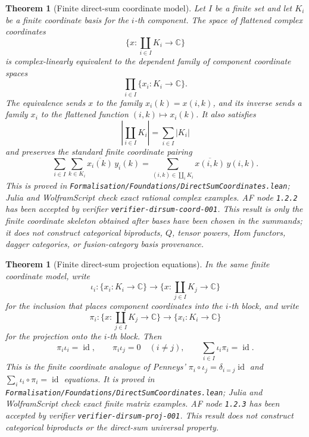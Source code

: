 \documentclass[11pt]{article}
\newtheorem{theorem}[definition]{Theorem}
\begin{document}
\begin{theorem}[Finite direct-sum coordinate model]
Let \(I\) be a finite set and let \(K_i\) be a finite coordinate basis for
the \(i\)-th component. The space of flattened complex coordinates
\[
\{x:\coprod_{i\in I}K_i\to \mathbb C\}
\]
is complex-linearly equivalent to the dependent family of component coordinate
spaces
\[
\prod_{i\in I}\{x_i:K_i\to\mathbb C\}.
\]
The equivalence sends \(x\) to the family \(x_i(k)=x(i,k)\), and its inverse
sends a family \(x_i\) to the flattened function \((i,k)\mapsto x_i(k)\).
It also satisfies
\[
\left|\coprod_{i\in I}K_i\right|=\sum_{i\in I}|K_i|
\]
and preserves the standard finite coordinate pairing
\[
\sum_{i\in I}\sum_{k\in K_i}\overline{x_i(k)}\,y_i(k)
=
\sum_{(i,k)\in\coprod_i K_i}\overline{x(i,k)}\,y(i,k).
\]
This is proved in
\texttt{Formalisation/Foundations/DirectSumCoordinates.lean}; Julia and
WolframScript check exact rational complex examples. AF node \texttt{1.2.2}
has been accepted by verifier \texttt{verifier-dirsum-coord-001}. This result
is only the finite coordinate skeleton obtained after bases have been chosen
in the summands; it does not construct categorical biproducts, \(Q\), tensor
powers, Hom functors, dagger categories, or fusion-category basis provenance.
\end{theorem}

\begin{theorem}[Finite direct-sum projection equations]
In the same finite coordinate model, write
\[
\iota_i:\{x_i:K_i\to\mathbb C\}\to
\{x:\coprod_{j\in I}K_j\to\mathbb C\}
\]
for the inclusion that places component coordinates into the \(i\)-th block,
and write
\[
\pi_i:\{x:\coprod_{j\in I}K_j\to\mathbb C\}\to
\{x_i:K_i\to\mathbb C\}
\]
for the projection onto the \(i\)-th block. Then
\[
\pi_i\iota_i=\operatorname{id},
\qquad
\pi_i\iota_j=0\quad(i\ne j),
\qquad
\sum_{i\in I}\iota_i\pi_i=\operatorname{id}.
\]
This is the finite coordinate analogue of Penneys'
\(\pi_i\circ\iota_j=\delta_{i=j}\operatorname{id}\) and
\(\sum_i\iota_i\circ\pi_i=\operatorname{id}\) equations. It is proved in
\texttt{Formalisation/Foundations/DirectSumCoordinates.lean}; Julia and
WolframScript check exact finite matrix examples. AF node \texttt{1.2.3} has
been accepted by verifier \texttt{verifier-dirsum-proj-001}. This result does
not construct categorical biproducts or the direct-sum universal property.
\end{theorem}
\end{document}
